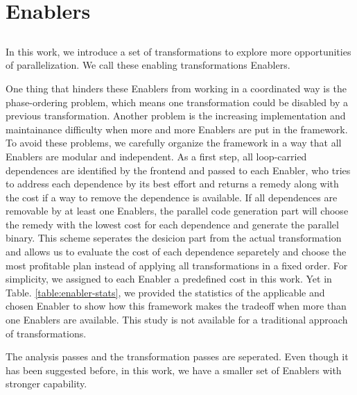 \section{Enablers}
\label{sec:enables}


\subsection{}




In this work, we introduce a set of transformations to explore more
opportunities of parallelization. We call these enabling transformations
Enablers.


One thing that hinders these Enablers from working in a coordinated way is
the phase-ordering problem, which means one transformation could be disabled
by a previous transformation. Another problem is the increasing
implementation and maintainance difficulty when more and more Enablers are
put in the framework. To avoid these problems, we carefully organize the
framework in a way that all Enablers are modular and independent. As a first
step, all loop-carried dependences are identified by the frontend and passed
to each Enabler, who tries to address each dependence by its best effort and
returns a remedy along with the cost if a way to remove the dependence is
available. If all dependences are removable by at least one Enablers, the
parallel code generation part will choose the remedy with the lowest cost
for each dependence and generate the parallel binary. This scheme seperates
the desicion part from the actual transformation and allows us to evaluate
the cost of each dependence separetely and choose the most profitable plan
instead of applying all transformations in a fixed order. For simplicity, we
assigned to each Enabler a predefined cost in this work. Yet in Table.
\ref{table:enabler-stats}, we provided the statistics of the applicable and
chosen Enabler to show how this framework makes the tradeoff when more than
one Enablers are available. This study is not available for a traditional
approach of transformations.

The analysis passes and the transformation passes are seperated. Even though
it has been suggested before, in this work, we have a smaller set of
Enablers with stronger capability.

